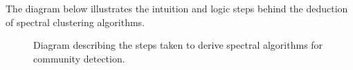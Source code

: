 \documentclass[../../main.tex]{subfiles} %
\begin{document}
The diagram below illustrates the intuition and logic steps behind the deduction 
of spectral clustering algorithms.
\begin{figure}[ht]
	\centering
	\caption{Diagram describing the steps taken to derive spectral algorithms for 
	community detection.}
	\label{fig:diagram-spectral-algorithms}
\end{figure}
\end{document}
